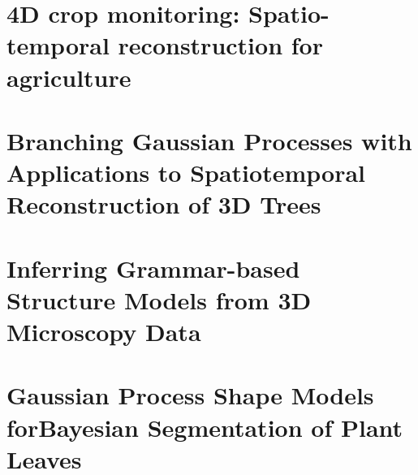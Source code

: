\documentclass{article}
\begin{document}
\section{4D crop monitoring: Spatio-temporal reconstruction for agriculture ~\cite{dong-2017-4d}}

\section{Branching Gaussian Processes with Applications to Spatiotemporal Reconstruction of 3D Trees ~\cite{simek-2016-branching}}

\section{Inferring Grammar-based Structure Models from 3D Microscopy Data ~\cite{schlecht-2007-inferring}}

\section{Gaussian Process Shape Models forBayesian Segmentation of Plant Leaves ~\cite{simek-2015-gaussian}}






	
\end{document}
